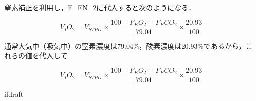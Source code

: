 窒素補正を利用し，F_EN_2に代入すると次のようになる．

\begin{equation}
  V_IO_2 = V_{STPD} \times \frac{100 - F_EO_2 - F_ECO_2}{79.04} \times \frac{20.93}{100}
\end{equation}

通常大気中（吸気中）の窒素濃度は79.04\%，酸素濃度は20.93\%であるから，これらの値を代入して

\begin{equation}
  V_IO_2 = V_{STPD} \times \frac{100 - F_EO_2 - F_ECO_2}{79.04} \times \frac{20.93}{100}
\end{equation}

\expandafter\ifx\csname ifdraft\endcsname\relax
  
\fi
